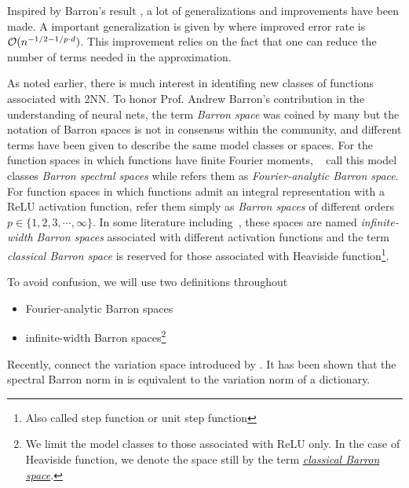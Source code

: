 
Inspired by Barron's result \citep{eRepresentationFormulasPointwise2020,
carageaNeuralNetworkApproximation2022}, a lot of generalizations and
improvements have been made. A important generalization is given by
\cite{makovozRandomApproximantsNeural1996} where improved error rate is
$\mathcal{O}(n^{-1/2-1 / p\cdot d})$. This improvement relies on the fact that one can
reduce the number of terms needed in the approximation. 

As noted earlier, there is much interest in identifing new classes of functions
associated with 2NN. To honor Prof. Andrew Barron's contribution in the
understanding of neural nets, the term \textit{Barron space} was coined by many
but the notation of Barron spaces is not in consensus within the community, and
different terms have been given to describe the same model classes or spaces.
For the function spaces in which functions have finite Fourier moments,
~\cite{xuFiniteNeuronMethod2020} call this model classes \textit{Barron spectral
spaces} while \cite{carageaNeuralNetworkApproximation2022} refers them as
\textit{Fourier-analytic Barron space}.  For function spaces in which functions
admit an integral representation with a ReLU activation function,
\cite{eBarronSpaceFlowinduced2021} refer them simply as \textit{Barron spaces}
of different orders $p \in \{1, 2, 3, \cdots, \infty\}$. In some literature
including~\cite{carageaNeuralNetworkApproximation2022}, these spaces are named
\textit{infinite-width Barron spaces} associated with different activation
functions and the term \textit{classical Barron space} is reserved for those
associated with Heaviside function\footnote{Also called step function or unit
step function}.

To avoid confusion, we will use two definitions throughout
\begin{itemize}
    \item Fourier-analytic Barron spaces
    \item infinite-width Barron spaces\footnote{
        We limit the model classes to those associated with ReLU only. In the 
        case of Heaviside function, we denote the space still by the term 
        \hyperref[def:heaviside_space]{\textit{classical Barron space}}.
    }
\end{itemize}

Recently, \cite{siegelCharacterizationVariationSpaces2022} connect the variation
space introduced by \cite{parhiBanachSpaceRepresenter2021,
parhiWhatKindsFunctions2022}. It has been shown that the spectral Barron norm in
is equivalent to the variation norm of a dictionary. 

